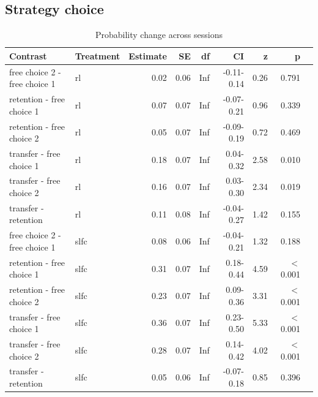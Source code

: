 \documentclass[pdflatex,sn-mathphys-num]{sn-jnl}%
\theoremstyle{thmstyleone}%
\theoremstyle{thmstyletwo}%
\theoremstyle{thmstylethree}%
\begin{document}
\begin{appendices}
\subsection{Strategy choice}








\begin{table}[ht]
\caption{Probability change across sessions}\label{strategychoice_theorybest_change}
\begin{tabular}{llrrrrrrr}
  \hline
 Contrast & Treatment & Estimate & SE & df & CI & z & p \\ 
  \hline
  free choice 2 - free choice 1 & rl & 0.02 & 0.06 & Inf & -0.11-0.14 & 0.26 &   0.791 \\ 
  retention - free choice 1 & rl & 0.07 & 0.07 & Inf & -0.07-0.21 & 0.96 &   0.339 \\ 
  retention - free choice 2 & rl & 0.05 & 0.07 & Inf & -0.09-0.19 & 0.72 &    0.469 \\ 
  transfer - free choice 1 & rl & 0.18 & 0.07 & Inf & 0.04-0.32 & 2.58 &    0.010 \\ 
  transfer - free choice 2 & rl & 0.16 & 0.07 & Inf & 0.03-0.30 & 2.34 &    0.019 \\ 
  transfer - retention & rl & 0.11 & 0.08 & Inf & -0.04-0.27 & 1.42 &    0.155 \\ 
  free choice 2 - free choice 1 & slfc & 0.08 & 0.06 & Inf & -0.04-0.21 & 1.32 &    0.188 \\ 
  retention - free choice 1 & slfc & 0.31 & 0.07 & Inf & 0.18-0.44 & 4.59 &  $<$  0.001 \\ 
  retention - free choice 2 & slfc & 0.23 & 0.07 & Inf & 0.09-0.36 & 3.31 &  $<$  0.001 \\ 
  transfer - free choice 1 & slfc & 0.36 & 0.07 & Inf & 0.23-0.50 & 5.33 &  $<$  0.001 \\ 
  transfer - free choice 2 & slfc & 0.28 & 0.07 & Inf & 0.14-0.42 & 4.02 &  $<$  0.001 \\ 
  transfer - retention & slfc & 0.05 & 0.06 & Inf & -0.07-0.18 & 0.85 &    0.396 \\ 
   \hline
\end{tabular}
\end{table}

\newpage


\end{appendices}
\end{document}

